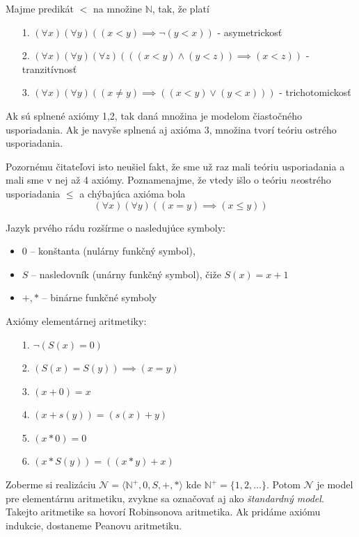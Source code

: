 \begin{priklad}
    Majme predikát $<$ na množine $\mathbb{N}$, tak, že platí
    \begin{itemize}
    \item[1.] $(\forall x)(\forall y) ((x < y) \implies \neg (y < x))$
    - asymetrickosť
    \item[2.] $(\forall x)(\forall y)(\forall z) (((x<y) \land (y<z)) \implies
        (x<z))$ - tranzitívnosť
    \item[3.] $(\forall x)(\forall y)( (x\not=y) \implies ((x<y) \lor (y<x)))$ -
     trichotomickosť
    \end{itemize}
    Ak sú splnené axiómy 1,2, tak daná množina je modelom čiastočného
    usporiadania. Ak je
    navyše splnená aj axióma 3, množina tvorí teóriu ostrého
    usporiadania.
\end{priklad}
\begin{poznamka}
    Pozornému čitateľovi isto neušiel fakt, že sme už raz mali teóriu
    usporiadania a mali sme v nej až 4 axiómy. Poznamenajme, že vtedy
    išlo o teóriu \emph{ne}ostrého usporiadania $\le$ a chýbajúca
    axióma bola
    \begin{equation*}
        (\forall x)(\forall y) ((x=y) \implies (x \le y))
    \end{equation*}
\end{poznamka}

\begin{priklad}
    Jazyk prvého rádu rozšírme o nasledujúce symboly:
    \begin{itemize}
        \item $0$ -- konštanta (nulárny funkčný symbol),
        \item $S$ -- nasledovník (unárny funkčný symbol), čiže $S(x)=x+1$
        \item $+,*$ -- binárne funkčné symboly
    \end{itemize}
    Axiómy elementárnej aritmetiky:
    \begin{itemize}
        \item[1.] $\neg (S(x) = 0)$
        \item[2.] $(S(x) = S(y)) \implies (x=y)$
        \item[3.] $(x+0) = x$
        \item[4.] $(x+s(y)) = (s(x) + y)$
        \item[5.] $(x * 0) = 0$
        \item[6.] $(x * S(y)) = ((x*y)+x)$
    \end{itemize}
    Zoberme si realizáciu 
        $\mathcal{N}=\langle \mathbb{N}^+,0,S,+,* \rangle$ kde  
        $\mathbb{N}^+ = \{1,2,\dots\}$.
        Potom $\mathcal{N}$ je model pre elementárnu aritmetiku,
        zvykne sa označovať aj ako \emph{štandardný model}.
        Takejto aritmetike sa hovorí Robinsonova aritmetika.
        Ak pridáme axiómu indukcie, dostaneme Peanovu aritmetiku.
\end{priklad}

